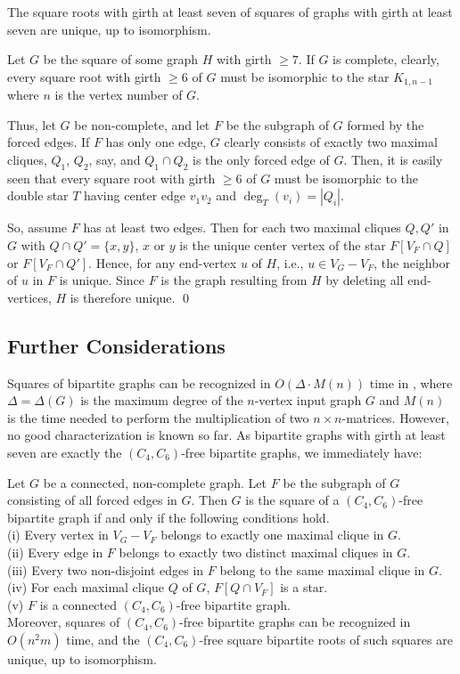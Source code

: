 \documentclass[proceedings]{stacs}
\begin{document}
\begin{corollary}\label{coro:unique}
The square roots with girth at least seven of squares of graphs with girth at least seven are
unique, up to isomorphism.
\end{corollary}
\proof Let $G$ be the square of some graph $H$ with girth $\ge 7$. If $G$ is complete, clearly,
every square root with girth $\ge 6$ of $G$ must be isomorphic to the star $K_{1, n-1}$ where
$n$ is the vertex number of $G$.

Thus, let $G$ be non-complete, and let $F$ be the subgraph of $G$ formed by the forced edges. If
$F$ has only one edge, $G$ clearly consists of exactly two maximal cliques, $Q_1$, $Q_2$, say,
and $Q_1\cap Q_2$ is the only forced edge of $G$. Then, it is easily seen that every square root
with girth $\ge 6$ of $G$ must be isomorphic to the double star $T$ having center edge $v_1v_2$
and $\deg_T(v_i)=|Q_i|$.

So, assume $F$ has at least two edges. Then for each two maximal cliques
$Q, Q'$ in $G$ with $Q\cap Q'=\{x,y\}$, $x$ or $y$ is the unique center vertex of the star
$F[V_F\cap Q]$ or $F[V_F\cap Q']$. Hence, for any end-vertex $u$ of $H$, i.e., $u\in V_G-V_F$,
the neighbor of $u$ in $F$ is unique. Since $F$ is the graph resulting from $H$ by deleting
all end-vertices, $H$ is therefore unique. \qed


\subsection{Further Considerations}\label{sec:girth-k}

Squares of bipartite graphs can be recognized in $O(\Delta\cdot M(n))$ time in \cite{Lau2006},
where $\Delta=\Delta(G)$ is the maximum degree of the $n$-vertex input graph $G$ and $M(n)$ is
the time needed to perform the multiplication of two $n\times n$-matrices. However, no good
characterization is known so far. As bipartite graphs with girth at least seven are exactly the
$(C_4,C_6)$-free bipartite graphs, we immediately have:

\begin{corollary}\label{coro:C4C6freebip}
Let $G$ be a connected, non-complete graph. Let $F$ be the subgraph of $G$ consisting of all forced
edges in $G$. Then $G$ is the square of a $(C_4,C_6)$-free bipartite graph if and only if the following
conditions hold.\\
(i)  Every vertex in $V_G-V_F$ belongs to exactly one maximal clique in $G$.\\
(ii)  Every edge in $F$ belongs to exactly two distinct maximal cliques in $G$.\\
(iii) Every two non-disjoint edges in $F$ belong to the same maximal clique in $G$.\\
(iv)  For each maximal clique $Q$ of $G$, $F[Q\cap V_F]$ is a star.\\
(v)   $F$ is a connected $(C_4,C_6)$-free bipartite graph.\\
Moreover, squares of $(C_4,C_6)$-free bipartite graphs can be recognized in $O(n^2m)$ time, and the
$(C_4, C_6)$-free square bipartite roots of such squares are unique, up to isomorphism.
\end{corollary}
\end{document}
